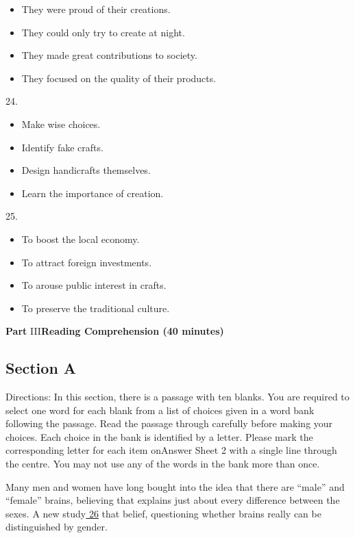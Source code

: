 \documentclass[UTF8,11pt]{ctexart}
\begin{document}
\begin{itemize}[leftmargin=2em,itemsep=.2em,topsep=.4em]\item[A.] They were proud of their creations.
\item[B.] They could only try to create at night.
\item[C.] They made great contributions to society.
\item[D.] They focused on the quality of their products.
\end{itemize}

24.


\begin{itemize}[leftmargin=2em,itemsep=.2em,topsep=.4em]\item[A.] Make wise choices.
\item[B.] Identify fake crafts.
\item[C.] Design handicrafts themselves.
\item[D.] Learn the importance of creation.
\end{itemize}

25.


\begin{itemize}[leftmargin=2em,itemsep=.2em,topsep=.4em]\item[A.] To boost the local economy.
\item[B.] To attract foreign investments.
\item[C.] To arouse public interest in crafts.
\item[D.] To preserve the traditional culture.
\end{itemize}

\textbf{Part} III\textbf{Reading Comprehension (40 minutes)}


\subsection*{\textbf{Section A}}


Directions: In this section, there is a passage with ten blanks. You are required to select one word for each blank from a list of choices given in a word bank following the passage. Read the passage through carefully before making your choices. Each choice in the bank is identified by a letter. Please mark the corresponding letter for each item onAnswer Sheet 2 with a single line through the centre. You may not use any of the words in the bank more than once.


Many men and women have long bought into the idea that there are “male” and “female” brains, believing that explains just about every difference between the sexes. A new study\uline{ 26} that belief, questioning whether brains really can be distinguished by gender.
\end{document}
